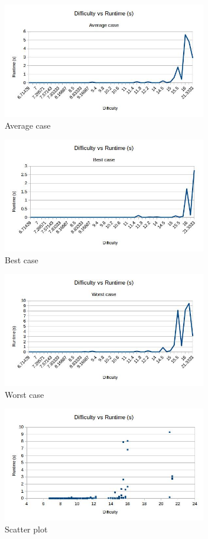 \documentclass{article}
\begin{document}
\begin{figure}[H]
	\includegraphics[width=0.9\linewidth, height=5cm]{graphs_outputs/DifficultyVSTimeAverage.jpg}
	\caption{Average case}
\end{figure}

\begin{figure}[H]
	\includegraphics[width=0.9\linewidth, height=5cm]{graphs_outputs/DifficultyVSTimeBest.jpg}
	\caption{Best case}
\end{figure}

\begin{figure}[H]
	\includegraphics[width=0.9\linewidth, height=5cm]{graphs_outputs/DifficultyVSTimeWorst.jpg}
	\caption{Worst case}
\end{figure}

\begin{figure}[H]
	\includegraphics[width=0.9\linewidth, height=5cm]{graphs_outputs/DifficultyVSTimeScatter.jpg}
	\caption{Scatter plot}
\end{figure}
\end{document}
